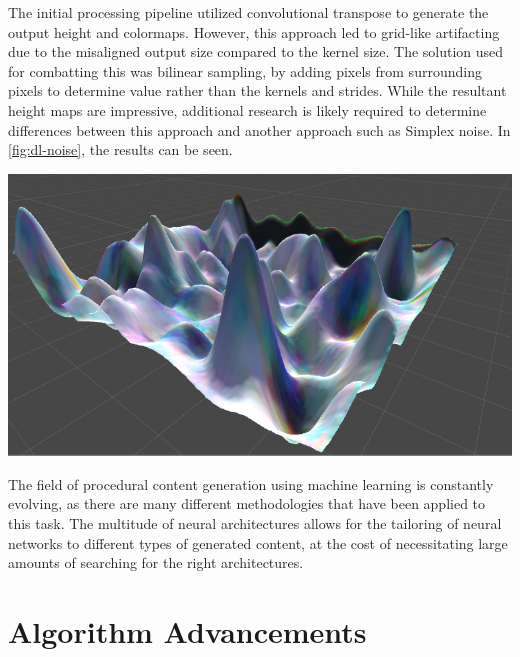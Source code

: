 \documentclass[10pt]{report}
\begin{document}
		The initial processing pipeline utilized convolutional transpose to generate the output height and colormaps. However, this approach led to grid-like artifacting due to the misaligned output size compared to the kernel size. The solution used for combatting this was bilinear sampling, by adding pixels from surrounding pixels to determine value rather than the kernels and strides. While the resultant height maps are impressive, additional research is likely required to determine differences between this approach and another approach such as Simplex noise. In \autoref{fig:dl-noise}, the results can be seen. 
		
		\begin{minipage}{\textwidth}
			\centering
			\includegraphics[scale=.3]{rolling}
			\label{fig:dl-noise}
		\end{minipage}
	
		The field of procedural content generation using machine learning is constantly evolving, as there are many different methodologies that have been applied to this task. The multitude of neural architectures allows for the tailoring of neural networks to different types of generated content, at the cost of necessitating large amounts of searching for the right architectures.
		
		\cite{Liu_2020}
		
		\section{Algorithm Advancements}
		
\end{document}
